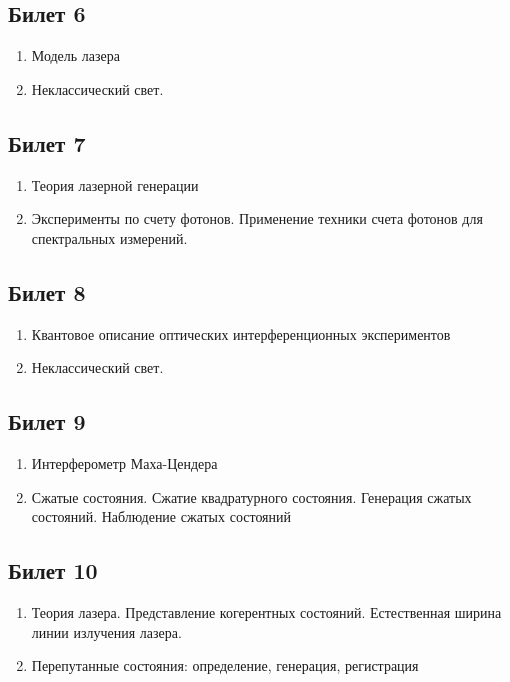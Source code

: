 \documentclass[12pt,a4paper]{article}
\begin{document}
\subsection*{Билет 6} 
\begin{enumerate}
\item Модель лазера
\item Неклассический свет.
\end{enumerate}

\subsection*{Билет 7} 
\begin{enumerate}
\item Теория лазерной генерации
\item Эксперименты по счету фотонов. Применение техники счета
  фотонов для спектральных измерений.
\end{enumerate}

\subsection*{Билет 8} 
\begin{enumerate}
\item Квантовое описание оптических интерференционных экспериментов
\item Неклассический свет.
\end{enumerate}

\subsection*{Билет 9} 
\begin{enumerate}
\item Интерферометр Маха-Цендера
\item Сжатые состояния. Сжатие квадратурного состояния. Генерация
  сжатых состояний. Наблюдение сжатых состояний
\end{enumerate}

\subsection*{Билет 10} 
\begin{enumerate}
\item Теория лазера. Представление когерентных состояний. Естественная
  ширина линии излучения лазера.
\item Перепутанные состояния: определение, генерация, регистрация
\end{enumerate}
\end{document}
